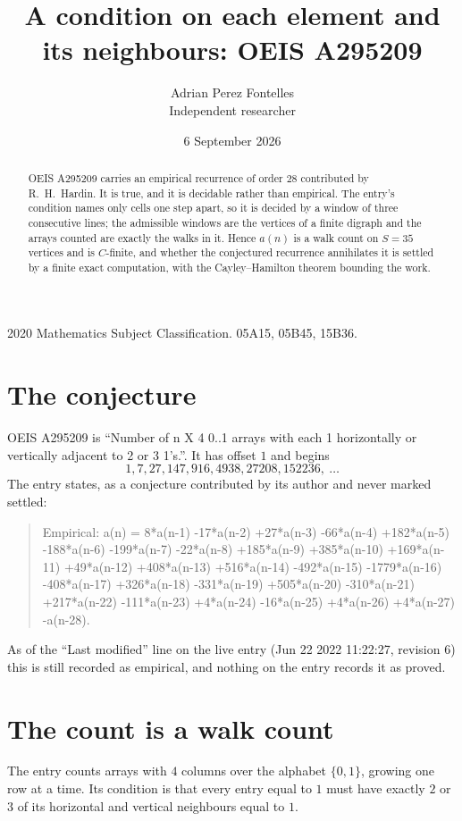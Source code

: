 \documentclass[11pt,a4paper]{article}
\title{A condition on each element and its neighbours: OEIS A295209}
\author{Adrian Perez Fontelles\\ \small Independent researcher}
\date{6 September 2026}
\theoremstyle{plain}
\theoremstyle{definition}
\begin{document}
\maketitle

\begin{abstract}
OEIS A295209 carries an empirical recurrence of order $28$ contributed by R.~H.~Hardin. It is
true, and it is decidable rather than empirical. The entry's condition names only cells one step apart, so it is decided by a window of
three consecutive lines; the
admissible windows are the vertices of a finite digraph and the arrays counted are exactly the
walks in it. Hence $a(n)$ is a walk count on $S=35$ vertices and is $C$-finite, and whether the
conjectured recurrence annihilates it is settled by a finite exact computation, with the
Cayley--Hamilton theorem bounding the work.
\end{abstract}

\noindent\small 2020 Mathematics Subject Classification. 05A15, 05B45, 15B36.\normalsize

\section{The conjecture}

OEIS A295209 is ``Number of n X 4 0..1 arrays with each 1 horizontally or vertically adjacent to 2 or 3 1's.''. It has offset $1$ and begins
\[
1, 7, 27, 147, 916, 4938, 27208, 152236,\ \dots
\]
The entry states, as a conjecture contributed by its author and never marked settled:
\begin{quote}
Empirical: a(n) = 8*a(n-1) -17*a(n-2) +27*a(n-3) -66*a(n-4) +182*a(n-5) -188*a(n-6) -199*a(n-7) -22*a(n-8) +185*a(n-9) +385*a(n-10) +169*a(n-11) +49*a(n-12) +408*a(n-13) +516*a(n-14) -492*a(n-15) -1779*a(n-16) -408*a(n-17) +326*a(n-18) -331*a(n-19) +505*a(n-20) -310*a(n-21) +217*a(n-22) -111*a(n-23) +4*a(n-24) -16*a(n-25) +4*a(n-26) +4*a(n-27) -a(n-28).
\end{quote}
As of the ``Last modified'' line on the live entry (Jun 22 2022 11:22:27, revision 6) this is still
recorded as empirical, and nothing on the entry records it as proved.

\section{The count is a walk count}

The entry counts arrays with $4$ columns over the alphabet $\{0,1\}$, growing one row at a time. Its condition is that every entry equal to $1$ must have exactly $2$ or $3$ of its horizontal and vertical neighbours equal to $1$.
\end{document}
